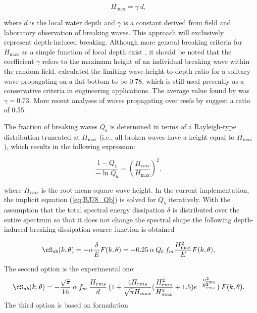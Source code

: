 
\begin{equation}
H_{\max} = \gamma \: d  , \label{eq:BJ78_McC}
\end{equation}

\noindent
where $d$ is the local water depth and $\gamma$ is a constant derived from
field and laboratory observation of breaking waves. This approach will
exclusively represent depth-induced breaking.  Although more general breaking
criteria for $H_{\max}$ as a simple function of local depth exist
\citep[e.g.,][]{art:TG83}, it should be noted that the coefficient $\gamma$
refers to the maximum height of an individual breaking wave within the random
field. \cite{art:M1894} calculated the limiting wave-height-to-depth ratio for
a solitary wave propagating on a flat bottom to be 0.78, which is still used
presently as a conservative criteria in engineering applications. The average
value found by \cite{pro:BJ78} was $\gamma = 0.73$. More recent analyses of
waves propagating over reefs by \cite{art:Nel94, art:Nel97} suggest a ratio of
0.55.

The fraction of breaking waves $Q_b$ is determined in terms of a Rayleigh-type
distribution truncated at $H_{\max}$ (i.e., all broken waves have a height
equal to $H_{max}$), which results in the following expression:


\begin{equation}
\frac{1 - Q_b}{-\ln Q_b} = \left ( \frac{H_{rms}}{H_{\max}} \right ) ^{2}
 , \label{eq:BJ78_Qb}
\end{equation}

\noindent
where $H_{rms}$ is the root-mean-square wave height. In the current
implementation, the implicit equation (\ref{eq:BJ78_Qb}) is solved for $Q_b$
iteratively. With the assumption that the total spectral energy dissipation
$\delta$ is distributed over the entire spectrum so that it does not change
the spectral shape \citep{art:EB96} the following depth-induced breaking
dissipation source function is obtained


\begin{equation}
\cS_{db} (k,\theta) = - \alpha \frac{\delta}{E} F(k,\theta)
       = - 0.25 \: \alpha \: Q_b \: f_m \frac{H_{\max}^2}{E} F(k,\theta)
 , \label{eq:BJ78}
\end{equation}

The second option is the experimental one:
\begin{equation}
\cS_{db} (k,\theta) = - \frac{\sqrt{\pi}}{16} \: \alpha \: f_m \: \frac{H_{rms}}{d} \: (1+\frac{4H_{rms}}{\sqrt{\pi}H_{max}}(\frac{H_{rms}^2}{H_{max}^2}+1.5)e^{-\frac{H_{rms}^2}{H_{max}^2}}) \: F(k,\theta)
 , \label{eq:BJ78b}
\end{equation}
The third option is based on \cite{thornton1983transformation} formulation

